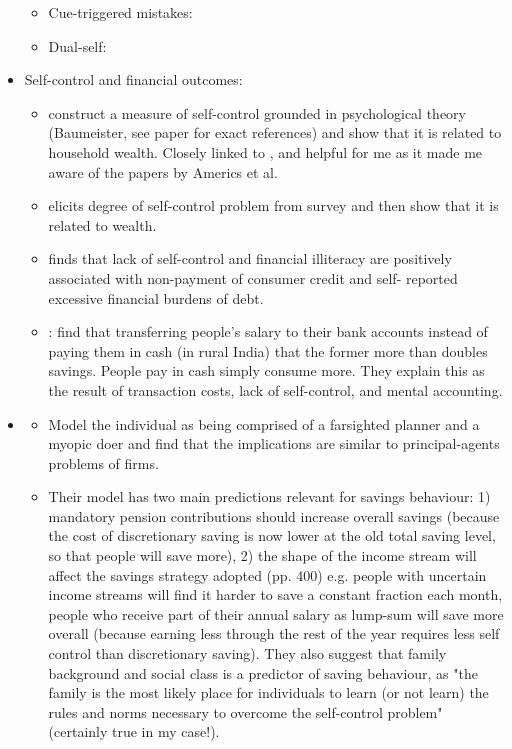 \documentclass[a4paper, 11pt]{report}
\begin{document}
\begin{itemize}
\begin{itemize}
		\item Cue-triggered mistakes: \citep{bernheim2004addiction}

		\item Dual-self: \citet{thaler1981economic,benhabib2005modeling,fudenberg2006dual,loewenstein2004animal}
	\end{itemize}

	\item Self-control and financial outcomes:
	\begin{itemize}
		\item \citet{biljanovska2018control} construct a measure of self-control grounded in psychological theory (Baumeister, see paper for exact references) and show that it is related to household wealth. Closely linked to \citet{gathergood2012self}, and helpful for me as it made me aware of the papers by Americs et al.

		\item \citep{ameriks2007measuring} elicits degree of self-control problem from survey and then show that it is related to wealth.

		\item \citet{gathergood2012self} finds that lack of self-control and financial illiteracy are positively associated with non-payment of consumer credit and self- reported excessive financial burdens of debt.

		\item \citet{somville2018saving}: find that transferring people's salary to their bank accounts instead of paying them in cash (in rural India) that the former more than doubles savings. People pay in cash simply consume more. They explain this as the result of transaction costs, lack of self-control, and mental accounting.
	\end{itemize}

	\item \citet{thaler1981economic}
	\begin{itemize}
		\item Model the individual as being comprised of a farsighted planner and a myopic doer and find that the implications are similar to principal-agents problems of firms.
		\item Their model has two main predictions relevant for savings behaviour: 1) mandatory pension contributions should increase overall savings (because the cost of discretionary saving is now lower at the old total saving level, so that people will save more), 2) the shape of the income stream will affect the savings strategy adopted (pp. 400) e.g. people with uncertain income streams will find it harder to save a constant fraction each month, people who receive part of their annual salary as lump-sum will save more overall (because earning less through the rest of the year requires less self control than discretionary saving). They also suggest that family background and social class is a predictor of saving behaviour, as "the family is the most likely place for individuals to learn (or not learn) the rules and norms necessary to overcome the self-control problem" (certainly true in my case!).
	\end{itemize}


\end{itemize}
\end{document}
